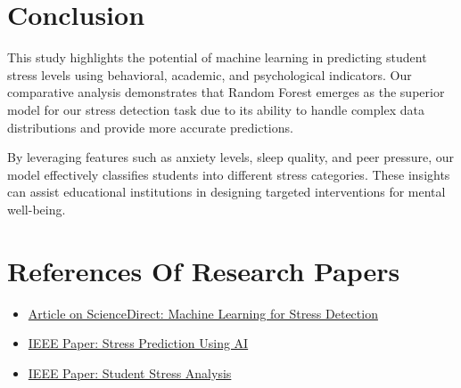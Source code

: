 \documentclass[a4paper,11pt]{article}
\begin{document}
\section{Conclusion}
This study highlights the potential of machine learning in predicting student stress levels using behavioral, academic, and psychological indicators. Our comparative analysis demonstrates that Random Forest emerges as the superior model for our stress detection task due to its ability to handle complex data distributions and provide more accurate predictions. 

By leveraging features such as anxiety levels, sleep quality, and peer pressure, our model effectively classifies students into different stress categories. These insights can assist educational institutions in designing targeted interventions for mental well-being.

\section{References Of Research Papers}

\begin{itemize}
    \item \href{https://www.sciencedirect.com/science/article/pii/S1877050919306581?via%3Dihub}{Article on ScienceDirect: Machine Learning for Stress Detection}
    \item \href{https://ieeexplore.ieee.org/abstract/document/10660827/metrics#metrics}{IEEE Paper: Stress Prediction Using AI}
    \item \href{https://ieeexplore.ieee.org/abstract/document/10660827}{IEEE Paper: Student Stress Analysis}
\end{itemize}
\end{document}
